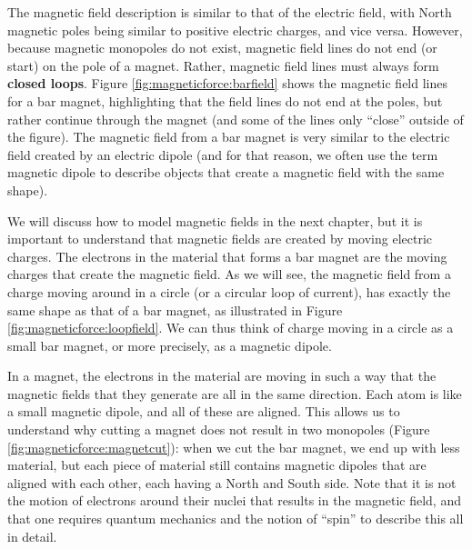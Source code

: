 The magnetic field description is similar to that of the electric field, with North magnetic poles being similar to positive electric charges, and vice versa.  However, because magnetic monopoles do not exist, magnetic field lines do not end (or start) on the pole of a magnet. Rather, magnetic field lines must always form \textbf{closed loops}. Figure \ref{fig:magneticforce:barfield} shows the magnetic field lines for a bar magnet, highlighting that the field lines do not end at the poles, but rather continue through the magnet (and some of the lines only ``close'' outside of the figure). The magnetic field from a bar magnet is very similar to the electric field created by an electric dipole (and for that reason, we often use the term magnetic dipole to describe objects that create a magnetic field with the same shape).


We will discuss how to model magnetic fields in the next chapter, but it is important to understand that magnetic fields are created by moving electric charges. The electrons in the material that forms a bar magnet are the moving charges that create the magnetic field. As we will see, the magnetic field from a charge moving around in a circle (or a circular loop of current), has exactly the same shape as that of a bar magnet, as illustrated in Figure \ref{fig:magneticforce:loopfield}. We can thus think of charge moving in a circle as a small bar magnet, or more precisely, as a magnetic dipole.


In a magnet, the electrons in the material are moving in such a way that the magnetic fields that they generate are all in the same direction. Each atom is like a small magnetic dipole, and all of these are aligned. This allows us to understand why cutting a magnet does not result in two monopoles (Figure \ref{fig:magneticforce:magnetcut}): when we cut the bar magnet, we end up with less material, but each piece of material still contains magnetic dipoles that are aligned with each other, each having a North and South side. Note that it is not the motion of electrons around their nuclei that results in the magnetic field, and that one  requires quantum mechanics and the notion of ``spin'' to describe this all in detail. 
 
